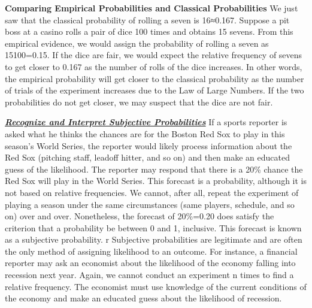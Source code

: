 \documentclass{report}
\begin{document}
    \bigbreak \noindent \bigbreak \noindent 
    \textbf{Comparing Empirical Probabilities and Classical Probabilities}
    \bigbreak \noindent 
    We just saw that the classical probability of rolling a seven is 16≈0.167. Suppose a pit boss at a casino rolls a pair of dice 100 times and obtains 15 sevens. From this empirical evidence, we would assign the probability of rolling a seven as 15100=0.15. If the dice are fair, we would expect the relative frequency of sevens to get closer to 0.167 as the number of rolls of the dice increases. In other words, the empirical probability will get closer to the classical probability as the number of trials of the experiment increases due to the Law of Large Numbers. If the two probabilities do not get closer, we may suspect that the dice are not fair.
    \bigbreak \noindent 

    \bigbreak \noindent \bigbreak \noindent 
    \textbf{\textit{\underline{Recognize and Interpret Subjective Probabilities}}}
    \bigbreak \noindent 
    If a sports reporter is asked what he thinks the chances are for the Boston Red Sox to play in this season's World Series, the reporter would likely process information about the Red Sox (pitching staff, leadoff hitter, and so on) and then make an educated guess of the likelihood. The reporter may respond that there is a 20\% chance the Red Sox will play in the World Series. This forecast is a probability, although it is not based on relative frequencies. We cannot, after all, repeat the experiment of playing a season under the same circumstances (same players, schedule, and so on) over and over. Nonetheless, the forecast of 20\%=0.20 does satisfy the criterion that a probability be between 0 and 1, inclusive. This forecast is known as a subjective probability.
    \bigbreak \noindent r
    Subjective probabilities are legitimate and are often the only method of assigning likelihood to an outcome. For instance, a financial reporter may ask an economist about the likelihood of the economy falling into recession next year. Again, we cannot conduct an experiment n times to find a relative frequency. The economist must use knowledge of the current conditions of the economy and make an educated guess about the likelihood of recession.

    \pagebreak \bigbreak \noindent
\end{document}
